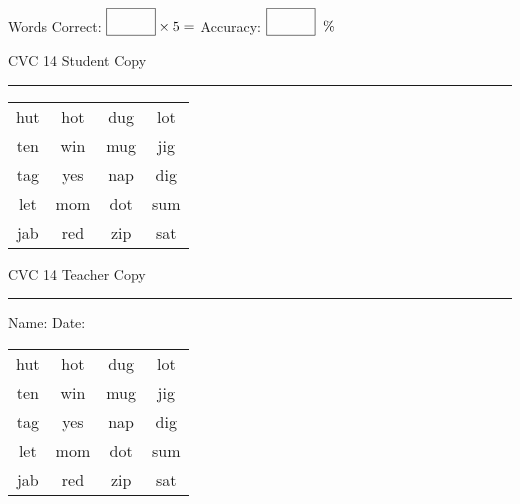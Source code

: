 \documentclass{memoir}
\begin{document}
\normalsize

Words Correct: $\fbox{\phantom{\huge 100}} \times 5 = $ Accuracy: $\fbox{\phantom{\huge 100}}\;\; \%$ 

\vfill

\newpage


\footnotesize \noindent
CVC 14 \hfill Student Copy
\smallskip
\hrule

\huge

\setlength{\tabcolsep}{14pt}
\def\arraystretch{2}

{\selectfont


\begin{vplace}[0.5]
\begin{center}
\begin{tabular}{cccc}
hut & hot & dug & lot \\
ten & win & mug & jig \\
tag & yes & nap & dig \\
let & mom & dot & sum \\
jab & red & zip & sat \\
\end{tabular}
\end{center}
\end{vplace}

}

\newpage

\footnotesize \noindent
CVC 14 \hfill Teacher Copy
\smallskip
\hrule

\normalsize

\vfill

\noindent
Name: \underline{\hspace{1.75in}} \hfill Date: \underline{\hspace{1in}}

\huge

{\selectfont


\begin{vplace}[0.5]
\begin{center}
\begin{tabular}{cccc}
hut & hot & dug & lot \\
ten & win & mug & jig \\
tag & yes & nap & dig \\
let & mom & dot & sum \\
jab & red & zip & sat \\
\end{tabular}
\end{center}
\end{vplace}



}
\end{document}
